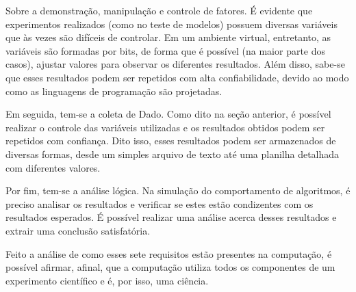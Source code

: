 Sobre a demonstração, manipulação e controle de fatores. É evidente que experimentos realizados (como no teste de modelos) possuem diversas variáveis que às vezes são difíceis de controlar. Em um ambiente virtual, entretanto, as variáveis são formadas por bits, de forma que é possível (na maior parte dos casos), ajustar valores para observar os diferentes resultados. Além disso, sabe-se que esses resultados podem ser repetidos com alta confiabilidade, devido ao modo como as linguagens de programação são projetadas.

Em seguida, tem-se a coleta de \gls{Dado}. Como dito na seção anterior, é possível realizar o controle das variáveis utilizadas e os resultados obtidos podem ser repetidos com confiança. Dito isso, esses resultados podem ser armazenados de diversas formas, desde um simples arquivo de texto até uma planilha detalhada com diferentes valores.

Por fim, tem-se a análise lógica. Na simulação do comportamento de algoritmos, é preciso analisar os resultados e verificar se estes estão condizentes com os resultados esperados. É possível realizar uma análise acerca desses resultados e extrair uma conclusão satisfatória.

Feito a análise de como esses sete requisitos estão presentes na computação, é possível afirmar, afinal, que a computação utiliza todos os componentes de um experimento científico e é, por isso, uma ciência.